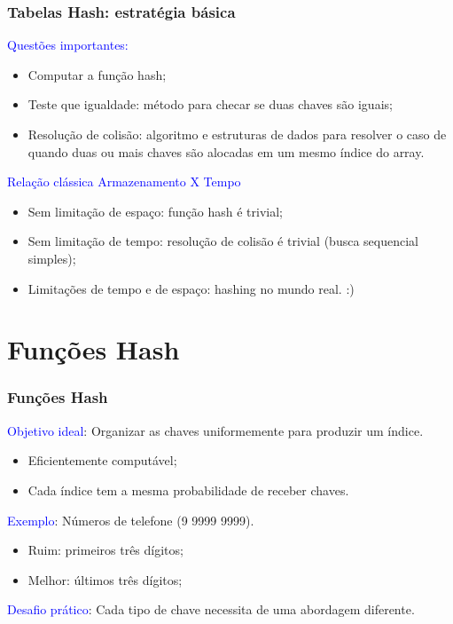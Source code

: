 \documentclass{beamer}
\newcommand{\tcb}[1]{\textcolor{blue}{#1}}
\begin{document}
\begin{frame}
  \frametitle{Tabelas Hash: estratégia básica}

  \tcb{Questões importantes:}
  \begin{itemize}
    \item Computar a função hash;
    \item Teste que igualdade: método para checar se duas chaves são iguais;
    \item Resolução de colisão: algoritmo e estruturas de dados para resolver o caso de quando duas ou mais chaves são alocadas em um mesmo índice do array.
  \end{itemize}
  
  \tcb{Relação clássica Armazenamento X Tempo}
  \begin{itemize}
    \item Sem limitação de espaço: função hash é trivial;
    \item Sem limitação de tempo: resolução de colisão é trivial (busca sequencial simples);
    \item Limitações de tempo e de espaço: hashing no mundo real. :)
  \end{itemize}
\end{frame}

\section{Funções Hash}

\begin{frame}
  \frametitle{Funções Hash}

  \tcb{Objetivo ideal}: Organizar as chaves uniformemente para produzir um índice.
  \begin{itemize}
    \item Eficientemente computável;
    \item Cada índice tem a mesma probabilidade de receber chaves.
  \end{itemize}

  \tcb{Exemplo}: Números de telefone (9 9999 9999).
  \begin{itemize}
    \item Ruim: primeiros três dígitos;
    \item Melhor: últimos três dígitos;
  \end{itemize}

  \tcb{Desafio prático}: Cada tipo de chave necessita de uma abordagem diferente.
\end{frame}
\end{document}
